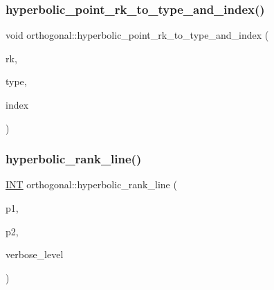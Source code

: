 \subsubsection{\texorpdfstring{hyperbolic\+\_\+point\+\_\+rk\+\_\+to\+\_\+type\+\_\+and\+\_\+index()}{hyperbolic\_point\_rk\_to\_type\_and\_index()}}
{\footnotesize\ttfamily void orthogonal\+::hyperbolic\+\_\+point\+\_\+rk\+\_\+to\+\_\+type\+\_\+and\+\_\+index (\begin{DoxyParamCaption}\item[{\mbox{\hyperlink{galois_8h_a09fddde158a3a20bd2dcadb609de11dc}{I\+NT}}}]{rk,  }\item[{\mbox{\hyperlink{galois_8h_a09fddde158a3a20bd2dcadb609de11dc}{I\+NT}} \&}]{type,  }\item[{\mbox{\hyperlink{galois_8h_a09fddde158a3a20bd2dcadb609de11dc}{I\+NT}} \&}]{index }\end{DoxyParamCaption})}

\mbox{\label{classorthogonal_a2810f9a6851f445b03fdbfe2a888e9f5}} 
\subsubsection{\texorpdfstring{hyperbolic\+\_\+rank\+\_\+line()}{hyperbolic\_rank\_line()}}
{\footnotesize\ttfamily \mbox{\hyperlink{galois_8h_a09fddde158a3a20bd2dcadb609de11dc}{I\+NT}} orthogonal\+::hyperbolic\+\_\+rank\+\_\+line (\begin{DoxyParamCaption}\item[{\mbox{\hyperlink{galois_8h_a09fddde158a3a20bd2dcadb609de11dc}{I\+NT}}}]{p1,  }\item[{\mbox{\hyperlink{galois_8h_a09fddde158a3a20bd2dcadb609de11dc}{I\+NT}}}]{p2,  }\item[{\mbox{\hyperlink{galois_8h_a09fddde158a3a20bd2dcadb609de11dc}{I\+NT}}}]{verbose\+\_\+level }\end{DoxyParamCaption})}

\mbox{\label{classorthogonal_af31cd843ff2e6eb4fe1ba9c49e62d1b8}} 

